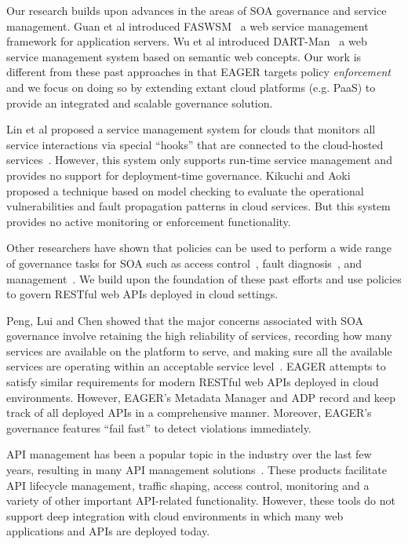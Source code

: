 Our research builds upon advances in the areas of SOA governance and
service management. 
Guan et al introduced FASWSM~\cite{1607141} a web service management
framework for application servers. Wu et al introduced DART-Man~\cite{1504267} a web
service management system based on semantic web concepts. 
Our work is different 
from these past approaches in that EAGER targets policy \textit{enforcement} 
and we focus on doing so by extending extant
cloud platforms (e.g. PaaS) to provide an integrated and scalable governance
solution.

Lin et al proposed a service management system for clouds that monitors all
service interactions via special ``hooks'' that are connected to the
cloud-hosted services~\cite{5616981}. However, this system only supports run-time
service management and provides no support for deployment-time governance. 
Kikuchi and Aoki~\cite{6525502} proposed a technique
based on model checking to evaluate the operational vulnerabilities and fault
propagation patterns in cloud services. But this system provides no
active monitoring or enforcement functionality.

Other researchers have shown that policies can be
used to perform a wide range of governance tasks for SOA such as access
control~\cite{4279630}, fault diagnosis~\cite{6154236},
and management~\cite{Suleiman:2009:IUM:1564601.1564730}. We build
upon the foundation of these past efforts and use policies to govern
RESTful web APIs deployed in cloud settings. 

Peng, Lui and Chen showed that
the major concerns associated with SOA governance 
involve retaining the high reliability of services, recording how many services
are available on the platform to serve, and making sure all the available 
services are operating within an acceptable service
level~\cite{4730489}. EAGER attempts to satisfy similar requirements for 
modern RESTful web APIs deployed in cloud environments. 
However, EAGER's Metadata Manager and ADP record and keep track of all deployed APIs 
in a comprehensive manner.  Moreover, EAGER's governance features 
``fail fast'' to detect violations immediately.

API management has been a popular topic in the industry over the last few years, resulting
in many API management solutions~\cite{wso2am,apigee}. These products facilitate
API lifecycle management, traffic shaping, access control, monitoring and a variety of other
important API-related functionality. However, these tools do not support deep integration with
cloud environments in which many web applications and APIs are deployed today. 

